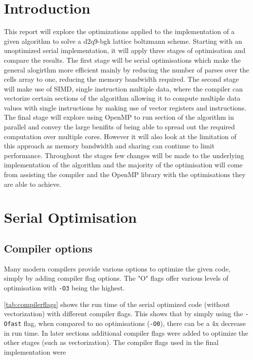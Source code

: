 \documentclass{article}
\begin{document}
\begin{multicols}{2}

\section{Introduction}

This report will explore the optimizations applied to the implementation of
a given algorithm to solve a d2q9-bgk lattice boltzmann scheme.  Starting with
an unoptimized serial implementation, it will apply three stages of optimisation
and compare the results. The first stage will be serial optimisations which
make the general alogirthm more efficient mainly by reducing the number of
parses over the cells array to one, reducing the memory bandwidth required. The
second stage will make use of SIMD, single instruction multiple data, where the
compiler can vectorize certain sections of the algorithm allowing it to compute
multiple data values with single instructions by making use of vector registers
and instructions. The final stage will explore using OpenMP to run section of
the algorithm in parallel and convey the large benifits of being able to spread
out the required computation over multiple cores. However it will also look at
the limitation of this approach as memory bandwidth and sharing can continue to
limit performance. Throughout the stages few changes will be made to the
underlying implementation of the algorithm and the majority of the optimisation
will come from assisting the compiler and the OpenMP library with the
optimisations they are able to achieve.

\section{Serial Optimisation}

\subsection{Compiler options}

Many modern compilers provide various options to optimize the given code,
simply by adding compiler flag options. The "O" flags offer various levels of
optimisation with \verb|-O3| being the highest.

\autoref{tab:compilerflags} shows the run time of the serial optimized code
(without vectorization) with different compiler flags. This shows that by
simply using the \verb|-Ofast| flag, when compared to no optimisations
(\verb|-O0|), there can be a 4x decrease in run time. In later sections
additional compiler flags were added to optimize the other stages (such as
vectorization). The compiler flags used in the final implementation were 


\end{multicols}
\end{document}
